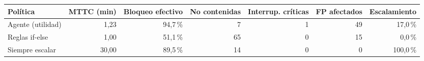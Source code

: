 \begin{tabular}{lrrrrrr}
\toprule
Política & MTTC (min) & Bloqueo efectivo & No contenidas & Interrup. críticas & FP afectados & Escalamiento \\
\midrule
Agente (utilidad) & 1,23 & 94,7\,\% & 7 & 1 & 49 & 17,0\,\% \\
Reglas if-else & 1,00 & 51,1\,\% & 65 & 0 & 15 & 0,0\,\% \\
Siempre escalar & 30,00 & 89,5\,\% & 14 & 0 & 0 & 100,0\,\% \\
\bottomrule
\end{tabular}

